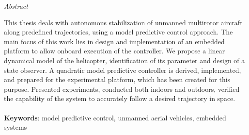 \vfill
\begin{center}
{\it \large Abstract}
\vspace{0.2cm}

\begin{minipage}{0.8\textwidth}{
This thesis deals with autonomous stabilization of unmanned multirotor aircraft along predefined trajectories, using a model predictive control approach. The main focus of this work lies in design and implementation of an embedded platform to allow onboard execution of the controller. We propose a linear dynamical model of the helicopter, identification of its parameter and design of a state observer. A quadratic model predictive controller is derived, implemented, and prepared for the experimental platform, which has been created for this purpose. Presented experiments, conducted both indoors and outdoors, verified the capability of the system to accurately follow a desired trajectory in space.
\\
\\
\textbf{Keywords}: model predictive control, unmanned aerial vehicles, embedded systems
}
\end{minipage}
\end{center}
\vfill
\vspace{1cm}

